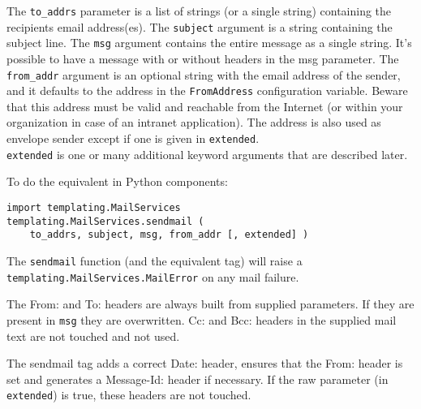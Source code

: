 \documentclass{manual}
\begin{document}
The \texttt{to_addrs} parameter is a list of strings 
(or a single string) containing the recipients email address(es). The
\texttt{subject} argument is a 
string containing the subject line. The \texttt{msg} argument contains
the entire message as a single string. It's possible to have a message
with or without headers in the msg parameter. The \texttt{from_addr} argument
is an optional string with the email address of the sender,
and it defaults to the address in the \texttt{FromAddress}
configuration variable. Beware that this address must be valid and
reachable from the Internet (or within your organization in case of
an intranet application). The address is also used as envelope
sender except if one is given in \texttt{extended}.\\
\texttt{extended} is one or many additional keyword arguments that are
described later.

To do the equivalent in Python components:
\begin{verbatim}
import templating.MailServices
templating.MailServices.sendmail ( 
    to_addrs, subject, msg, from_addr [, extended] )
\end{verbatim}


The \texttt{sendmail} function (and the equivalent tag) will raise a
\texttt{templating.MailServices.MailError} on any mail failure.

The From: and To: headers are always built from supplied parameters.
If they are present in \texttt{msg} they are overwritten.
Cc: and Bcc: headers in the supplied mail text are not touched
and not used.

The sendmail tag adds a correct Date: header, ensures that
the From: header is set and generates a Message-Id: header if
necessary. If the raw parameter (in \texttt{extended}) is true,
these headers are not touched.
\end{document}
